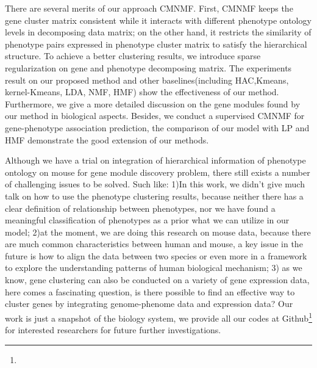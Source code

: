 \documentclass{bmcart}
\begin{document}
There are several merits of our approach CMNMF. First, CMNMF keeps the gene cluster matrix consistent while it interacts with different phenotype ontology levels in decomposing data matrix; on the other hand, it restricts the similarity of phenotype pairs expressed in phenotype cluster matrix to satisfy the hierarchical structure. To achieve a better clustering results, we introduce sparse regularization on gene and phenotype decomposing matrix. The experiments result on our proposed method and other baselines(including HAC,Kmeans, kernel-Kmeans, LDA, NMF, HMF) show the effectiveness of our method. Furthermore, we give a more detailed discussion on the gene modules found by our method in biological aspects. Besides, we conduct a supervised CMNMF for gene-phenotype association prediction, the comparison of our model with LP and HMF demonstrate the good extension of our methods.

Although we have a trial on integration of hierarchical information of phenotype ontology on mouse for gene module discovery problem, there still exists a number of challenging issues to be solved. Such like: 1)In this work, we didn't give much talk on how to use the phenotype clustering results, because neither there has a clear definition of relationship between phenotypes, nor we have found a meaningful classification of phenotypes as a prior what we can utilize in our model; 2)at the moment, we are doing this research on mouse data, because there are much common characteristics between human and mouse, a key issue in the future is how to align the data between two species or even more in a framework to explore the understanding patterns of human biological mechanism; 3) as we know, gene clustering can also be conducted on a variety of gene expression data, here comes a fascinating question, is there possible to find an effective way to cluster genes by integrating genome-phenome data and expression data? Our work is just a snapshot of the biology system, we provide all our codes at Github\footnote{} for interested researchers for future further investigations.

\end{document}
